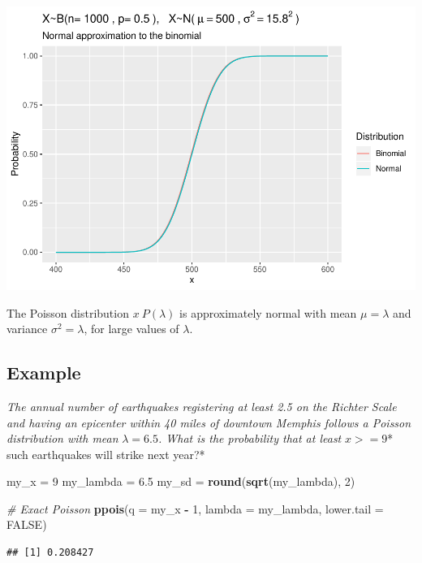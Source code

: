 \documentclass[
]{book}
\newenvironment{Shaded}{\begin{snugshade}}{\end{snugshade}}
\newcommand{\CommentTok}[1]{\textcolor[rgb]{0.56,0.35,0.01}{\textit{#1}}}
\newcommand{\DataTypeTok}[1]{\textcolor[rgb]{0.13,0.29,0.53}{#1}}
\newcommand{\DecValTok}[1]{\textcolor[rgb]{0.00,0.00,0.81}{#1}}
\newcommand{\FloatTok}[1]{\textcolor[rgb]{0.00,0.00,0.81}{#1}}
\newcommand{\KeywordTok}[1]{\textcolor[rgb]{0.13,0.29,0.53}{\textbf{#1}}}
\newcommand{\NormalTok}[1]{#1}
\newcommand{\OperatorTok}[1]{\textcolor[rgb]{0.81,0.36,0.00}{\textbf{#1}}}
\newcommand{\OtherTok}[1]{\textcolor[rgb]{0.56,0.35,0.01}{#1}}
\newcommand{\StringTok}[1]{\textcolor[rgb]{0.31,0.60,0.02}{#1}}
\begin{document}
\includegraphics{data-sci_files/figure-latex/unnamed-chunk-17-1.pdf}

The Poisson distribution \(x~P(\lambda)\) is approximately normal with mean \(\mu = \lambda\) and variance \(\sigma^2 = \lambda\), for large values of \(\lambda\).

\hypertarget{example-5}{%
\subsection{Example}\label{example-5}}

\emph{The annual number of earthquakes registering at least 2.5 on the Richter Scale and having an epicenter within 40 miles of downtown Memphis follows a Poisson distribution with mean }\(\lambda=6.5\)\emph{. What is the probability that at least }\(x>=9\)* such earthquakes will strike next year?*

\begin{Shaded}
\begin{Highlighting}[]
\NormalTok{my_x =}\StringTok{ }\DecValTok{9}
\NormalTok{my_lambda =}\StringTok{ }\FloatTok{6.5}
\NormalTok{my_sd =}\StringTok{ }\KeywordTok{round}\NormalTok{(}\KeywordTok{sqrt}\NormalTok{(my_lambda), }\DecValTok{2}\NormalTok{)}

\CommentTok{# Exact Poisson}
\KeywordTok{ppois}\NormalTok{(}\DataTypeTok{q =}\NormalTok{ my_x }\OperatorTok{-}\StringTok{ }\DecValTok{1}\NormalTok{, }\DataTypeTok{lambda =}\NormalTok{ my_lambda, }\DataTypeTok{lower.tail =} \OtherTok{FALSE}\NormalTok{)}
\end{Highlighting}
\end{Shaded}

\begin{verbatim}
## [1] 0.208427
\end{verbatim}
\end{document}
